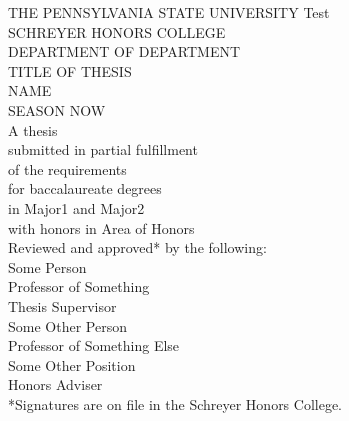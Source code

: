 
\begin{titlepage}
\center %

\vspace*{1.0cm}
THE PENNSYLVANIA STATE UNIVERSITY Test\\
SCHREYER HONORS COLLEGE\\[1.0cm]
DEPARTMENT OF DEPARTMENT\\[1.0cm]
TITLE OF THESIS\\[1.0cm]
NAME\\
SEASON NOW\\[1.0cm]
A thesis\\
submitted in partial fulfillment\\
of the requirements\\
for baccalaureate degrees\\
in Major1 and Major2\\
with honors in Area of Honors\\[1.0cm]

Reviewed and approved* by the following:\\[0.5cm]
Some Person\\
Professor of Something\\
Thesis Supervisor\\[0.5cm]

Some Other Person\\
Professor of Something Else\\
Some Other Position\\
Honors Adviser\\[0.5cm]

*Signatures are on file in the Schreyer Honors College.

\end{titlepage}
